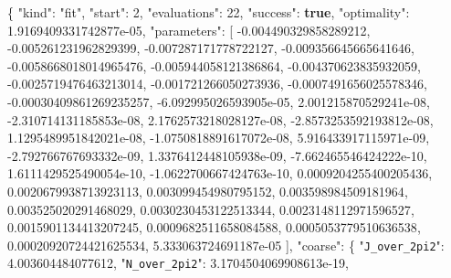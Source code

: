 \documentclass[
  10pt,
]{article}
\newenvironment{Shaded}{}{}
\newcommand{\DataTypeTok}[1]{\textcolor[rgb]{0.56,0.13,0.00}{#1}}
\newcommand{\DecValTok}[1]{\textcolor[rgb]{0.25,0.63,0.44}{#1}}
\newcommand{\FloatTok}[1]{\textcolor[rgb]{0.25,0.63,0.44}{#1}}
\newcommand{\FunctionTok}[1]{\textcolor[rgb]{0.02,0.16,0.49}{#1}}
\newcommand{\KeywordTok}[1]{\textcolor[rgb]{0.00,0.44,0.13}{\textbf{#1}}}
\newcommand{\OtherTok}[1]{\textcolor[rgb]{0.00,0.44,0.13}{#1}}
\newcommand{\StringTok}[1]{\textcolor[rgb]{0.25,0.44,0.63}{#1}}
\begin{document}
\begin{Shaded}
\begin{Highlighting}[]
\FunctionTok{\{}
  \DataTypeTok{"kind"}\FunctionTok{:} \StringTok{"fit"}\FunctionTok{,}
  \DataTypeTok{"start"}\FunctionTok{:} \DecValTok{2}\FunctionTok{,}
  \DataTypeTok{"evaluations"}\FunctionTok{:} \DecValTok{22}\FunctionTok{,}
  \DataTypeTok{"success"}\FunctionTok{:} \KeywordTok{true}\FunctionTok{,}
  \DataTypeTok{"optimality"}\FunctionTok{:} \FloatTok{1.9169409331742877e{-}05}\FunctionTok{,}
  \DataTypeTok{"parameters"}\FunctionTok{:} \OtherTok{[}
    \FloatTok{{-}0.004490329858289212}\OtherTok{,}
    \FloatTok{{-}0.005261231962829399}\OtherTok{,}
    \FloatTok{{-}0.007287171778722127}\OtherTok{,}
    \FloatTok{{-}0.009356645665641646}\OtherTok{,}
    \FloatTok{{-}0.0058668018014965476}\OtherTok{,}
    \FloatTok{{-}0.005944058121386864}\OtherTok{,}
    \FloatTok{{-}0.004370623835932059}\OtherTok{,}
    \FloatTok{{-}0.0025719476463213014}\OtherTok{,}
    \FloatTok{{-}0.001721266050273936}\OtherTok{,}
    \FloatTok{{-}0.0007491656025578346}\OtherTok{,}
    \FloatTok{{-}0.00030409861269235257}\OtherTok{,}
    \FloatTok{{-}6.092995026593905e{-}05}\OtherTok{,}
    \FloatTok{2.001215870529241e{-}08}\OtherTok{,}
    \FloatTok{{-}2.310714131185853e{-}08}\OtherTok{,}
    \FloatTok{2.1762573218028127e{-}08}\OtherTok{,}
    \FloatTok{{-}2.8573253592193812e{-}08}\OtherTok{,}
    \FloatTok{1.1295489951842021e{-}08}\OtherTok{,}
    \FloatTok{{-}1.0750818891617072e{-}08}\OtherTok{,}
    \FloatTok{5.916433917115971e{-}09}\OtherTok{,}
    \FloatTok{{-}2.792766767693332e{-}09}\OtherTok{,}
    \FloatTok{1.3376412448105938e{-}09}\OtherTok{,}
    \FloatTok{{-}7.662465546424222e{-}10}\OtherTok{,}
    \FloatTok{1.6111429525490054e{-}10}\OtherTok{,}
    \FloatTok{{-}1.0622700667424763e{-}10}\OtherTok{,}
    \FloatTok{0.0009204255400205436}\OtherTok{,}
    \FloatTok{0.0020679938713923113}\OtherTok{,}
    \FloatTok{0.003099454980795152}\OtherTok{,}
    \FloatTok{0.003598984509181964}\OtherTok{,}
    \FloatTok{0.003525020291468029}\OtherTok{,}
    \FloatTok{0.0030230453122513344}\OtherTok{,}
    \FloatTok{0.0023148112971596527}\OtherTok{,}
    \FloatTok{0.0015901134413207245}\OtherTok{,}
    \FloatTok{0.0009682511658084588}\OtherTok{,}
    \FloatTok{0.0005053779510636538}\OtherTok{,}
    \FloatTok{0.00020920724421625534}\OtherTok{,}
    \FloatTok{5.333063724691187e{-}05}
  \OtherTok{]}\FunctionTok{,}
  \DataTypeTok{"coarse"}\FunctionTok{:} \FunctionTok{\{}
    \DataTypeTok{"\nolinkurl{J_over_2pi2}"}\FunctionTok{:} \FloatTok{4.003604484077612}\FunctionTok{,}
    \DataTypeTok{"\nolinkurl{N_over_2pi2}"}\FunctionTok{:} \FloatTok{3.1704504069908613e{-}19}\FunctionTok{,}

\end{Highlighting}
\end{Shaded}
\end{document}
